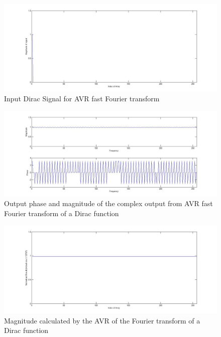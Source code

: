 \begin{figure}
\includegraphics[width=\textwidth]{./Figures/AVR_FFT_Dirac_Input.jpg}
\caption{Input Dirac Signal for AVR fast Fourier transform}
\label{fig:AVR:FFT:Dirac:Input}
\end{figure}
\begin{figure}
\includegraphics[width=\textwidth]{./Figures/AVR_FFT_Dirac_Complex_Output.jpg}
\caption{Output phase and magnitude of the complex output from AVR fast Fourier transform of a Dirac function}
\label{fig:AVR:FFT:Dirac:Output}
\end{figure}
\begin{figure}
\includegraphics[width=\textwidth]{./Figures/AVR_FFT_Dirac_Mag.jpg}
\caption{Magnitude calculated by the AVR of the Fourier transform of a Dirac function}
\label{fig:AVR:FFT:Dirac:Mag}
\end{figure}

